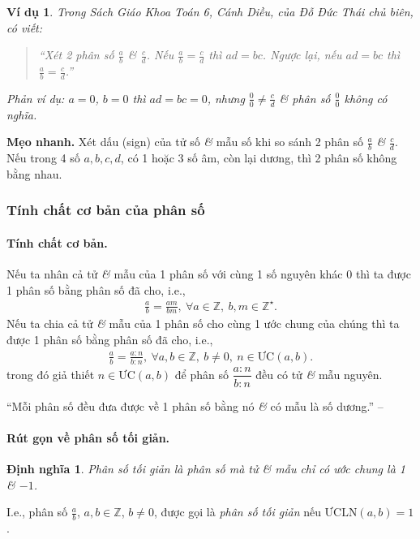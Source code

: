 \documentclass{article}
\numberwithin{equation}{section}
\newtheorem{definition}{Định nghĩa}[section]
\newtheorem{example}{Ví dụ}[section]
\begin{document}
\begin{example}
	Trong Sách Giáo Khoa Toán 6, Cánh Diều, của Đỗ Đức Thái chủ biên, có viết:
	\begin{quotation}
		``Xét 2 phân số $\frac{a}{b}$ \textit{\&} $\frac{c}{d}$. Nếu $\frac{a}{b} = \frac{c}{d}$ thì $ad = bc$. Ngược lại, nếu $ad = bc$ thì $\frac{a}{b} = \frac{c}{d}$.''
	\end{quotation}
	Phản ví dụ: $a = 0$, $b = 0$ thì $ad = bc = 0$, nhưng $\frac{0}{0}\ne\frac{c}{d}$ \textit{\&} phân số $\frac{0}{0}$ không có nghĩa.
\end{example}
\textbf{Mẹo nhanh.} Xét dấu (sign) của tử số \textit{\&} mẫu số khi so sánh 2 phân số $\frac{a}{b}$ \textit{\&} $\frac{c}{d}$. Nếu trong 4 số $a,b,c,d$, có 1 hoặc 3 số âm, còn lại dương, thì 2 phân số không bằng nhau.

\subsubsection{Tính chất cơ bản của phân số}

\paragraph{Tính chất cơ bản.} Nếu ta nhân cả tử \textit{\&} mẫu của 1 phân số với cùng 1 số nguyên khác 0 thì ta được 1 phân số bằng phân số đã cho, i.e.,
\begin{align*}
	\frac{a}{b} = \frac{am}{bm},\ \forall a\in\mathbb{Z},\ b,m\in\mathbb{Z}^\star.
\end{align*}
Nếu ta chia cả tử \textit{\&} mẫu của 1 phân số cho cùng 1 ước chung của chúng thì ta được 1 phân số bằng phân số đã cho, i.e.,
\begin{align*}
	\frac{a}{b} = \frac{a:n}{b:n},\ \forall a,b\in\mathbb{Z},\ b\ne 0,\ n\in\mbox{ƯC}(a,b).
\end{align*}
trong đó giả thiết $n\in\mbox{ƯC}(a,b)$ để phân số $\dfrac{a:n}{b:n}$ đều có tử \textit{\&} mẫu nguyên.

``Mỗi phân số đều đưa được về 1 phân số bằng nó \textit{\&} có mẫu là số dương.'' -- \cite[p. 28]{Thai_Anh_Dat_Ha_Loan_Nam_Quang_Toan_6_tap_2}

\paragraph{Rút gọn về phân số tối giản.}
\begin{definition}
	\emph{Phân số tối giản} là phân số mà tử \textit{\&} mẫu chỉ có ước chung là 1 \textit{\&} $-1$.
\end{definition}
I.e., phân số $\frac{a}{b}$, $a,b\in\mathbb{Z}$, $b\ne 0$, được gọi là \emph{phân số tối giản} nếu $\mbox{ƯCLN}(a,b) = 1$.
\end{document}

